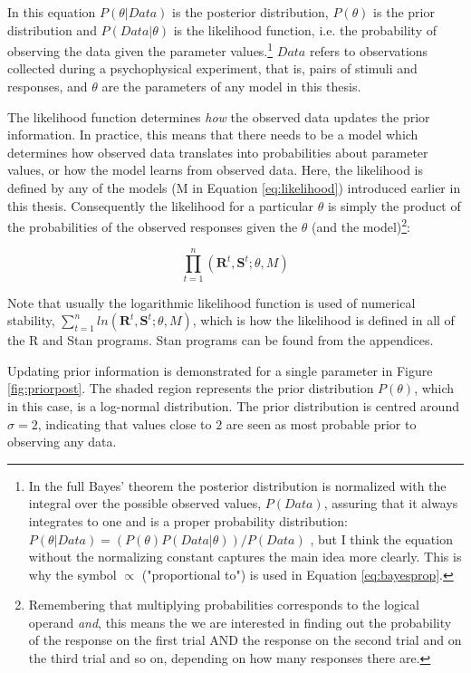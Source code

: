\documentclass{article}\usepackage{knitr}
\begin{document}
In this equation $P(\theta | Data)$ is the posterior distribution, $P(\theta)$ is the prior distribution and $P(Data | \theta)$ is the likelihood function, i.e. the probability of observing the data given the parameter values.\footnote{In the full Bayes' theorem the posterior distribution is normalized with the integral over the possible observed values, $P(Data)$, assuring that it always integrates to one and is a proper probability distribution: $P(\theta | Data) = (P(\theta) P(Data | \theta)) / P(Data)$ \citep{kruschke2015}, but I think the equation without the normalizing constant captures the main idea more clearly. This is why the symbol $\propto$ ("proportional to") is used in Equation \ref{eq:bayesprop}.} $Data$ refers to observations collected during a psychophysical experiment, that is, pairs of stimuli and responses, and $\theta$ are the parameters of any model in this thesis. 

The likelihood function determines \textit{how} the observed data updates the prior information. In practice, this means that there needs to be a model which determines how observed data translates into probabilities about parameter values, or how the model learns from observed data. Here, the likelihood is defined by any of the models (M in Equation \ref{eq:likelihood}) introduced earlier in this thesis. Consequently the likelihood for a particular $\theta$ is simply the product of the probabilities of the observed responses given the $\theta$ (and the model)\footnote{Remembering that multiplying probabilities corresponds to the logical operand \textit{and}, this means the we are interested in finding out the probability of the response on the first trial AND the response on the second trial and on the third trial and so on, depending on how many responses there are.}:

\begin{equation}
\prod_{t=1}^n (\bm{R}^t, \bm{S}^t; \theta, M)
\label{eq:likelihood}
\end{equation}

Note that usually the logarithmic likelihood function is used of numerical stability, $\sum_{t=1}^n ln (\bm{R}^t, \bm{S}^t; \theta, M)$, which is how the likelihood is defined in all of the R and Stan programs. Stan programs can be found from the appendices. 

Updating prior information is demonstrated for a single parameter in Figure \ref{fig:priorpost}. The shaded region represents the prior distribution $P(\theta)$, which in this case, is a log-normal distribution. The prior distribution is centred around $\sigma = 2$, indicating that values close to $2$ are seen as most probable prior to observing any data. 
\end{document}
